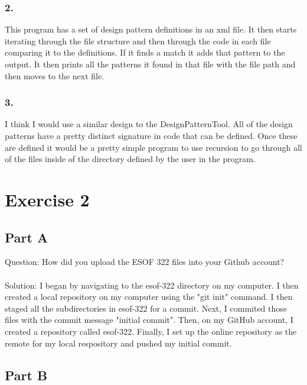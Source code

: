 \documentclass{article}
\begin{document}
\subsubsection*{2.}
This program has a set of design pattern definitions in an xml file. It then starts iterating through the file structure and then through the code in each file comparing it to the definitions. If it finds a match it adds that pattern to the output. It then prints all the patterns it found in that file with the file path and then moves to the next file. 
\subsubsection*{3.}
I think I would use a similar design to the DesignPatternTool. All of the design patterns have a pretty distinct signature in code that can be defined. Once these are defined it would be a pretty simple program to use recursion to go through all of the files inside of the directory defined by the user in the program.   


\newpage

\section*{Exercise 2}

\subsection*{Part A}

Question: How did you upload the ESOF 322 files into your Github account? \\\\
Solution: I began by navigating to the esof-322 directory on my computer. I then created a local repository on my computer using the "git init" command. 
I then staged all the subdirectories in esof-322 for a commit. Next, I commited those files with the commit message "initial commit".
Then, on my GitHub account, I created a repository called esof-322.
Finally, I set up the online repository as the remote for my local respository and pushed my initial commit.

\subsection*{Part B}
\end{document}
